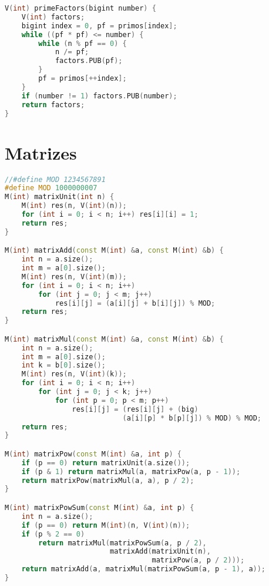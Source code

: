 \newpage

\begin{lstlisting}[language=C++, title={Fatores Primos}]
V(int) primeFactors(bigint number) {
    V(int) factors;
    bigint index = 0, pf = primos[index];
    while ((pf * pf) <= number) {
        while (n % pf == 0) {
            n /= pf;
            factors.PUB(pf);
        }
        pf = primos[++index];
    }
    if (number != 1) factors.PUB(number);
    return factors;
}
\end{lstlisting}

\newpage

\section{Matrizes}
\begin{lstlisting}[language=C++]
//#define MOD 1234567891
#define MOD 1000000007
M(int) matrixUnit(int n) {
    M(int) res(n, V(int)(n));
    for (int i = 0; i < n; i++) res[i][i] = 1;
    return res;
}

M(int) matrixAdd(const M(int) &a, const M(int) &b) {
    int n = a.size();
    int m = a[0].size();
    M(int) res(n, V(int)(m));
    for (int i = 0; i < n; i++)
        for (int j = 0; j < m; j++)
            res[i][j] = (a[i][j] + b[i][j]) % MOD;
    return res;
}

M(int) matrixMul(const M(int) &a, const M(int) &b) {
    int n = a.size();
    int m = a[0].size();
    int k = b[0].size();
    M(int) res(n, V(int)(k));
    for (int i = 0; i < n; i++)
        for (int j = 0; j < k; j++)
            for (int p = 0; p < m; p++)
                res[i][j] = (res[i][j] + (big)
                			(a[i][p] * b[p][j]) % MOD) % MOD;
    return res;
}

M(int) matrixPow(const M(int) &a, int p) {
    if (p == 0) return matrixUnit(a.size());
    if (p & 1) return matrixMul(a, matrixPow(a, p - 1));
    return matrixPow(matrixMul(a, a), p / 2);
}

M(int) matrixPowSum(const M(int) &a, int p) {
    int n = a.size();
    if (p == 0) return M(int)(n, V(int)(n));
    if (p % 2 == 0)
        return matrixMul(matrixPowSum(a, p / 2),
        				 matrixAdd(matrixUnit(n), 
                        		   matrixPow(a, p / 2)));
    return matrixAdd(a, matrixMul(matrixPowSum(a, p - 1), a));
}
\end{lstlisting}